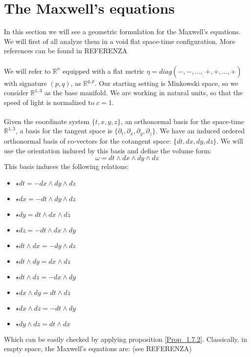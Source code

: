 \documentclass[12pt,a4paper]{report}
\theoremstyle{definition}
\theoremstyle{Theorem}
\theoremstyle{definition}
\theoremstyle{definition}
\begin{document}
	\section{The Maxwell's equations}
	In this section we will see a geometric formulation for the Maxwell's equations. We will first of all analyze them in a void flat space-time configuration. More references can be found in REFERENZA\\
	\\
	We will refer to $\mathbb{R}^n$ equipped with a flat metric $\eta=diag(-,-,...,_,+,+,...,+)$ with signature $(p,q)$, as $\mathbb{R}^{q,p}$. Our starting setting is Minkowski space, so we consider $\mathbb{R}^{1,3}$ as the base manifold. We are working in natural units, so that the speed of light is normalized to $c=1$.\\
	\\
	Given the coordinate system $\{t,x,y,z\}$, an orthonormal basis for the space-time $\mathbb{R}^{1,3}$, a basis for the tangent space is $\{\partial_t,\partial_x,\partial_y,\partial_z\}$. We have an induced ordered orthonormal basis of co-vectors for the cotangent space: $\{dt,dx,dy,dz\}$. We will use the orientation induced by this basis and define the volume form:
	$$\omega=dt\wedge dx\wedge dy\wedge dz$$
	This basis induces the following relations:
	\begin{multicols}{2}
		\begin{itemize}
			\item $\star dt= -dx\wedge dy\wedge dz$
			\item $\star dx= -dt\wedge dy\wedge dz$
			\item $\star dy= dt\wedge dx\wedge dz$
			\item $\star dz=-dt\wedge dx\wedge dy$
			\item $\star dt\wedge dx=-dy\wedge dz$
		\end{itemize}
		\columnbreak
		\begin{itemize}
			\item $\star dt\wedge dy=dx\wedge dz$
			\item $\star dt\wedge dz=-dx\wedge dy$
			\item $\star dx\wedge dy=dt\wedge dz$
			\item $\star dx\wedge dz=-dt\wedge dy$
			\item $\star dy\wedge dz=dt\wedge dx$
		\end{itemize} 
	\end{multicols}
	Which can be easily checked by applying proposition \ref{Prop_1.7.2}.
	Classically, in empty space, the Maxwell's equations are: (see REFERENZA)
\end{document}
